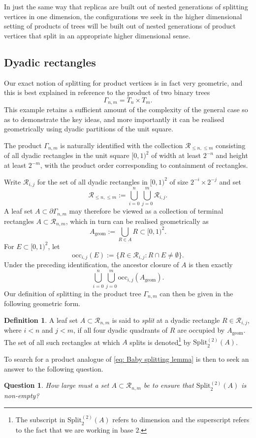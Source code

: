 \documentclass[11pt]{amsart}
\newcommand{\Split}{\mathrm{Split}}
\renewcommand{\leq}{\leqslant}
\theoremstyle{plain}
\newtheorem{qu}[thm]{Question}
\theoremstyle{definition}
\newtheorem{defn}[thm]{Definition}
\theoremstyle{remark}
\begin{document}
In just the same way that replicas are built out of nested generations of splitting vertices in one dimension, the configurations we seek in the higher dimensional setting of products of trees will be built out of nested generations of product vertices that split in an appropriate higher dimensional sense.

\subsection{Dyadic rectangles}
Our exact notion of splitting for product vertices is in fact very geometric, and this is best explained in reference to the product of two binary trees
\[ \Gamma_{n,m} = T_n \times T_m.\]
This example retains a sufficient amount of the complexity of the general case so as to demonstrate the key ideas, and more importantly it can be realised geometrically using dyadic partitions of the unit square.

The product $\Gamma_{n,m}$ is naturally identified with the collection $\mathcal{R}_{\leq n, \leq m}$ consisting of all dyadic rectangles in the unit square $[0,1)^2$ of width at least $2^{-n}$ and height at least $2^{-m}$, with the product order corresponding to containment of rectangles.

Write $\mathcal R_{i,j}$ for the set of all dyadic rectangles in $[0,1)^2$ of size $2^{-i}\times2^{-j}$ and set
\[\mathcal R_{\leq n,\leq m}:=\bigcup_{i=0}^n\bigcup_{j=0}^m\mathcal R_{i,j}.\]
A leaf set $A\subset\partial\Gamma_{n,m}$ may therefore be viewed as a collection of terminal rectangles $A\subset\mathcal R_{n,m}$, which in turn can be realised geometrically as
\[A_{\mathrm{geom}}:=\bigcup_{R\in A}R\subset[0,1)^2.\]
For $E\subset[0,1)^2$, let
\[\mathrm{occ}_{i,j}(E):=\{R\in\mathcal R_{i,j}:R\cap E\neq\emptyset\}.\]
Under the preceding identification, the ancestor closure of $A$ is then exactly
\begin{equation} \label{eq: Ancestor closure is occupied recs}
\bigcup_{i=0}^n\bigcup_{j=0}^m\mathrm{occ}_{i,j}(A_{\mathrm{geom}}).
\end{equation}
Our definition of splitting in the product tree $\Gamma_{n,m}$ can then be given in the following geometric form.
\begin{defn}
A leaf set $A\subset\mathcal R_{n,m}$ is said to \textit{split} at a dyadic rectangle $R\in\mathcal R_{i,j}$, where $i<n$ and $j<m$, if all four dyadic quadrants of $R$ are occupied by $A_{\mathrm{geom}}$. The set of all such rectangles at which $A$ splits is denoted\footnote{The subscript in $\Split_2^{(2)}(A)$ refers to dimension and the superscript refers to the fact that we are working in base $2$.} by $\Split_2^{(2)}(A)$.
\end{defn}
To search for a product analogue of \eqref{eq: Baby splitting lemma} is then to seek an answer to the following question.
\begin{qu}\label{Qu: 2d splits}
How large must a set $A\subset\mathcal R_{n,m}$ be to ensure that $\Split_2^{(2)}(A)$ is non-empty?
\end{qu}
\end{document}
